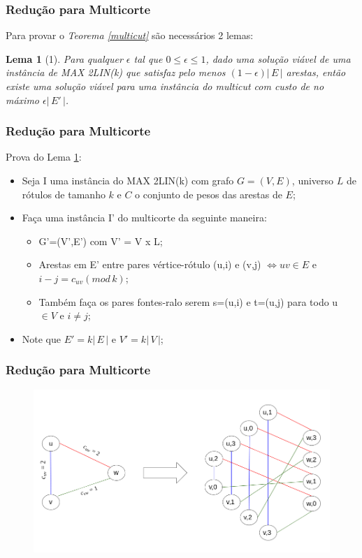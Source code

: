 \documentclass[11pt, handout]{beamer}
\newtheorem{lema}{Lema}
\begin{document}
\begin{frame}[<+->]
    \frametitle{Redução para Multicorte}
         Para provar o \emph{Teorema \ref{multicut}} são necessários 2 lemas:
        \begin{lema}[1] \label{lema1multicut}
            Para qualquer $\epsilon$ tal que $0 \le \epsilon \le 1$, dado uma solução viável de uma instância de  MAX 2LIN(k) que satisfaz pelo menos $(1-\epsilon)|\,E\,|$ arestas, então existe uma solução viável para uma instância do multicut com custo de no máximo $\epsilon|\,E'\,|$.
        \end{lema}
\end{frame}{}

\begin{frame}[<+->]
    \frametitle{Redução para Multicorte}
        Prova do Lema \ref{lema1multicut}:
        \begin{itemize}
          \item Seja I uma instância do MAX 2LIN(k) com grafo $G=(V,E)$, universo $L$ de rótulos de tamanho $k$ e $C$ o conjunto de pesos das arestas de $E$;
          \item Faça uma instância I' do multicorte da seguinte maneira: 
          \begin{itemize}
            \item G'=(V',E') com V' = V x L;
            \item Arestas em E' entre pares vértice-rótulo (u,i) e (v,j) $\iff uv \in E$ e $i-j=c_{uv}(mod\,k)$;
            \item Também faça os pares fontes-ralo serem s=(u,i) e t=(u,j) para todo u $\in V$ e $i \ne j$;
          \end{itemize}
          \item Note que $E'=k|\,E\,|$ e $V'=k|\,V\,|$;
          \end{itemize}
\end{frame}{}

\begin{frame}
    \frametitle{Redução para Multicorte}
    
    \begin{figure}
        \centering
        \includegraphics[width=1\textwidth]{images/graphGline.png}
    \end{figure}{}
    
\end{frame}
\end{document}
